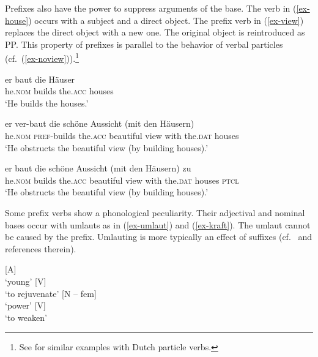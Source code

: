 \documentclass[output=paper
  ,nobabel
  ,draftmode
  ,colorlinks, citecolor=brown
]{langscibook}
\begin{document}
\noindent Prefixes also have the power to suppress arguments of the base. The verb in (\ref{ex-house}) occurs with a subject and a direct object. The prefix verb in (\ref{ex-view}) replaces the direct object with a new one. The original object is reintroduced as PP. This property of prefixes is parallel to the behavior of verbal particles (cf.\ (\ref{ex-noview})).\footnote{See \citet{Hoekstra1988} for similar examples with Dutch particle verbs.}

\eal
\ex\label{ex-house}
\gll er baut die Häuser \\
	he.\textsc{nom} builds the.\textsc{acc} houses\\
\glt	`He builds the houses.'

\ex\label{ex-view}
\gll er ver-baut die schöne Aussicht (mit den Häusern) \\
	he.\textsc{nom} \textsc{pref}-builds the.\textsc{acc} beautiful view with   the.\textsc{dat}   houses \\
\glt `He obstructs the beautiful view (by building houses).'

\ex\label{ex-noview}
\gll er              baut   die            schöne      Aussicht    (mit    den           Häusern)   zu\\
	he.\textsc{nom}   builds   the.\textsc{acc}   beautiful   view           with the.\textsc{dat} houses \textsc{ptcl} \\
\glt	`He obstructs the beautiful view (by building houses).'
\zl

\noindent 
Some prefix verbs show a phonological peculiarity. Their adjectival and nominal bases occur with
umlauts as in (\ref{ex-umlaut}) and (\ref{ex-kraft}). The umlaut cannot be caused by the
prefix. Umlauting is more typically an effect of suffixes (cf.\ \citealt[101]{Eschenlohr1999} and references therein).

\begin{exe}
\ex
  \begin{xlist}
\label{ex-umlaut}
\ex\label{jüng}  [A]\\`young'
\ex {} [V]\\`to rejuvenate'
\zl
\eal 
\label{ex-kraft}
\ex{} [N -- fem]\\`power'
\ex {} [V]\\`to weaken'
\end{xlist}
\end{exe}
\end{document}
